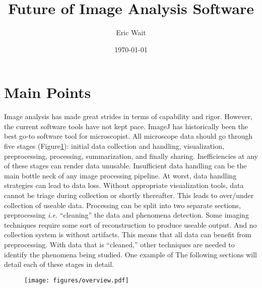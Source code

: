 \documentclass[11pt]{article}
\author{Eric Wait}
\title{Future of Image Analysis Software}
\date{\today}
\newcommand{\ie}[1]{\textit{i.e.} {#1}}
\begin{document}
	\maketitle
	\newpage

	\listoftodos
	\newpage

	\section{Main Points}\label{sec:main_points}
		Image analysis has made great strides in terms of capability and rigor.
		However, the current software tools have not kept pace.
		ImageJ has historically been the best go-to software tool for microscopist.
		All microscope data should go through five stages (Figure\ref{fig:overview}): initial data collection and handling, visualization, preprocessing, processing, summarization, and finally sharing.
		Inefficiencies at any of these stages can render data unusable.
		Insufficient data handling can be the main bottle neck of any image processing pipeline.
		At worst, data handling strategies can lead to data loss.
		Without appropriate visualization tools, data cannot be triage during collection or shortly thereafter.
		This leads to over/under collection of useable data.
		Processing can be split into two separate sections, preprocessing \ie{``cleaning'' the data} and phenomena detection.
		Some imaging techniques require some sort of reconstruction to produce useable output.
		And no collection system is without artifacts.
		This means that all data can benefit from preprocessing.
		With data that is ``cleaned,'' other techniques are needed to identify the phenomena being studied.
		One example of 
		The following sections will detail each of these stages in detail. 
		
		\begin{figure}
			\centering
				\texttt{[image: figures/overview.pdf]}
			\label{fig:overview}
		\end{figure}
\end{document}

